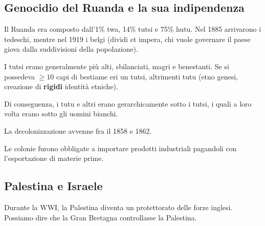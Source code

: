 \documentclass[a4paper]{article}
\begin{document}
\pagebreak

\subsection{Genocidio del Ruanda e la sua indipendenza}

Il Ruanda era composto dall'1\% twa, 14\% tutsi e 75\% hutu.
Nel 1885 arrivarono i tedeschi, mentre nel 1919 i belgi (dividi et impera, chi vuole governare
il paese giova dalla suddivisioni della popolazione).

I tutsi erano generalmente più alti, sbilanciati, magri e benestanti.
Se si possedeva \(\geq 10\) capi di bestiame eri un tutsi, altrimenti tutu (etno genesi,
creazione di \textbf{rigidi} identità etniche).

Di conseguenza, i tutu e altri erano gerarchicamente sotto i tutsi, i quali a loro volta
erano sotto gli uomini bianchi.

La decolonizzazione avvenne fra il 1858 e 1862.



Le colonie furono obbligate a importare prodotti industriali
pagandoli con l'esportazione di materie prime.


\subsection{Palestina e Israele}

Durante la WWI, la Palestina diventa un protettorato delle forze inglesi.
Possiamo dire che la Gran Bretagna controllasse la Palestina.

\end{document}
